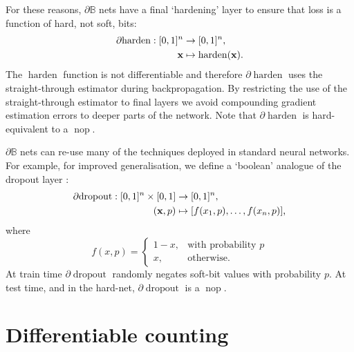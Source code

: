 \documentclass{article}
\theoremstyle{plain}
\theoremstyle{definition}
\theoremstyle{remark}
\begin{document}
For these reasons, $\partial\mathbb{B}$ nets have a final `hardening' layer to ensure that loss is a function of hard, not soft, bits:
\begin{equation*}
\begin{aligned}
\partial\!\operatorname{harden}: [0,1]^{n} &\to [0,1]^{n}, \\
{\bf x} &\mapsto \operatorname{harden}({\bf x})\text{.}
\end{aligned}
\end{equation*}
The $\operatorname{harden}$ function is not differentiable and therefore $\partial\!\operatorname{harden}$ uses the straight-through estimator \cite{DBLP:journals/corr/BengioLC13} during backpropagation. By restricting the use of the straight-through estimator to final layers we avoid compounding gradient estimation errors to deeper parts of the network. Note that $\partial\!\operatorname{harden}$ is hard-equivalent to a $\operatorname{nop}$.

$\partial\mathbb{B}$ nets can re-use many of the techniques deployed in standard neural networks. For example, for improved generalisation, we define a `boolean' analogue of the dropout layer \cite{JMLR:v15:srivastava14a}:
\begin{equation*}
\begin{aligned}
\partial\!\operatorname{dropout}: [0,1]^{n} \times [0,1] &\to [0,1]^{n}, \\
({\bf x}, p) &\mapsto [f(x_{1}, p), \dots, f(x_{n}, p)]\text{,}
\end{aligned}
\end{equation*}
where
\begin{equation*}
f(x, p) = \begin{cases}
1 - x, & \text{with probability } p \\
x, & \text{otherwise.}
\end{cases}
\end{equation*}
At train time $\partial\!\operatorname{dropout}$ randomly negates soft-bit values with probability $p$. At test time, and in the hard-net, $\partial\!\operatorname{dropout}$ is a $\operatorname{nop}$.

\section{Differentiable counting}\label{sec:counting}
\end{document}
